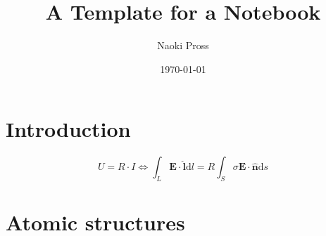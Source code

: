 \documentclass[a4paper]{article}
\title{A Template for a Notebook}
\author{
  Naoki Pross
}
\date{\today}
\begin{document}
\maketitle
\tableofcontents

\section{Introduction}
\blindtext
\[
  U = R \cdot I \iff
  \int_L \mathbf{E \cdot \hat{l}} \mathrm{d}l = 
  R \int_{S} \sigma \mathbf{E \cdot \hat{n}} \mathrm{d}s
\]

\newpage

\section{Atomic structures}
\end{document}
